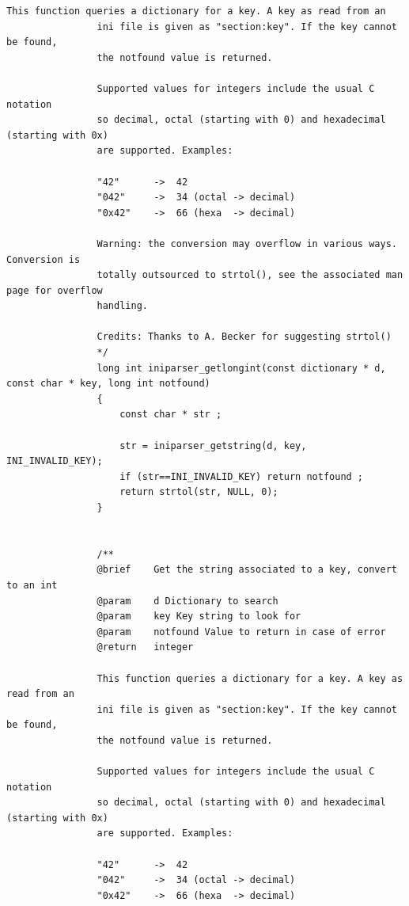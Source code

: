 \documentclass{article}
\begin{document}
\begin{Verbatim}[gobble=8]
                This function queries a dictionary for a key. A key as read from an
                ini file is given as "section:key". If the key cannot be found,
                the notfound value is returned.
                
                Supported values for integers include the usual C notation
                so decimal, octal (starting with 0) and hexadecimal (starting with 0x)
                are supported. Examples:
                
                "42"      ->  42
                "042"     ->  34 (octal -> decimal)
                "0x42"    ->  66 (hexa  -> decimal)
                
                Warning: the conversion may overflow in various ways. Conversion is
                totally outsourced to strtol(), see the associated man page for overflow
                handling.
                
                Credits: Thanks to A. Becker for suggesting strtol()
                */
                long int iniparser_getlongint(const dictionary * d, const char * key, long int notfound)
                {
                    const char * str ;
                
                    str = iniparser_getstring(d, key, INI_INVALID_KEY);
                    if (str==INI_INVALID_KEY) return notfound ;
                    return strtol(str, NULL, 0);
                }
                
                
                /**
                @brief    Get the string associated to a key, convert to an int
                @param    d Dictionary to search
                @param    key Key string to look for
                @param    notfound Value to return in case of error
                @return   integer
                
                This function queries a dictionary for a key. A key as read from an
                ini file is given as "section:key". If the key cannot be found,
                the notfound value is returned.
                
                Supported values for integers include the usual C notation
                so decimal, octal (starting with 0) and hexadecimal (starting with 0x)
                are supported. Examples:
                
                "42"      ->  42
                "042"     ->  34 (octal -> decimal)
                "0x42"    ->  66 (hexa  -> decimal)
                

\end{Verbatim}
\end{document}
